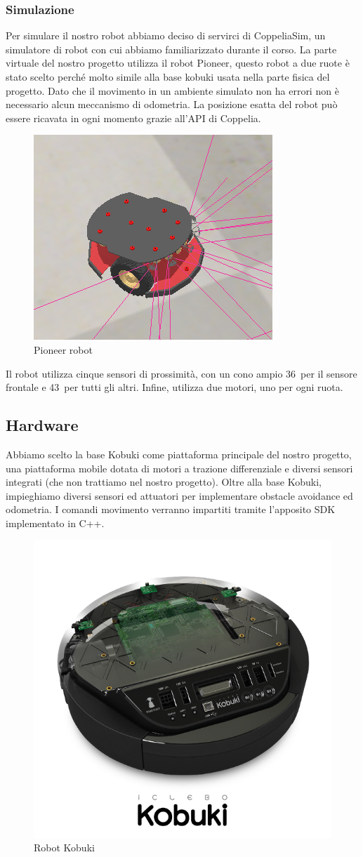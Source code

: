 \documentclass[]{article}
\begin{document}
\subsubsection{Simulazione}
Per simulare il nostro robot abbiamo deciso di servirci di CoppeliaSim, un simulatore di robot con cui abbiamo familiarizzato durante il corso.
La parte virtuale del nostro progetto utilizza il robot Pioneer, questo robot a due ruote è stato scelto perché molto simile alla base kobuki usata nella parte fisica del progetto.
Dato che il movimento in un ambiente simulato non ha errori non è necessario alcun meccanismo di odometria. La posizione esatta del robot può essere ricavata in ogni momento grazie all'API di Coppelia. 
\begin{figure}[H]
    \centering
    \includegraphics[width=0.4\linewidth]{immagini/PioneerRobot.png}
    \caption{Pioneer robot}
\end{figure}
Il robot utilizza cinque sensori di prossimità, con un cono ampio 36\textdegree\ per il sensore frontale e 43\textdegree\ per tutti gli altri. Infine, utilizza due motori, uno per ogni ruota. 


\subsection{Hardware}

Abbiamo scelto la base Kobuki come piattaforma principale del nostro progetto, una piattaforma mobile dotata di motori a trazione differenziale e diversi sensori integrati (che non trattiamo nel nostro progetto). Oltre alla base Kobuki, impieghiamo diversi sensori ed attuatori per implementare obstacle avoidance ed odometria.
I comandi movimento verranno impartiti tramite l'apposito SDK implementato in C++\cite{kobukisdk}.
\begin{figure}[H]
    \centering
    \includegraphics[width=0.3\linewidth]{immagini/kobuki.png}
    \caption{Robot Kobuki}
\end{figure}
\end{document}
